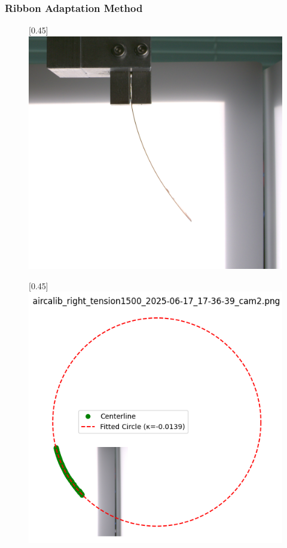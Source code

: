 \subsubsection{Ribbon Adaptation Method}

\begin{figure}[H]
    \centering
    \begin{subcaptionbox}{\label{fig:conveyor}}[0.45\linewidth]
        {\includegraphics[width=\linewidth]{images/ribbonadapter/aircalib_right_tension1500_2025-06-17_17-36-39_cam23.png}}
    \end{subcaptionbox}
    \hspace{0.05\linewidth}
    \begin{subcaptionbox}{\label{fig:right}}[0.45\linewidth]
        {\includegraphics[width=\linewidth]{images/ribbonadapter/aircalib_right_tension1500_2025-06-17_17-36-39_cam2_debug3.png}}

\end{subcaptionbox}
\end{figure}
